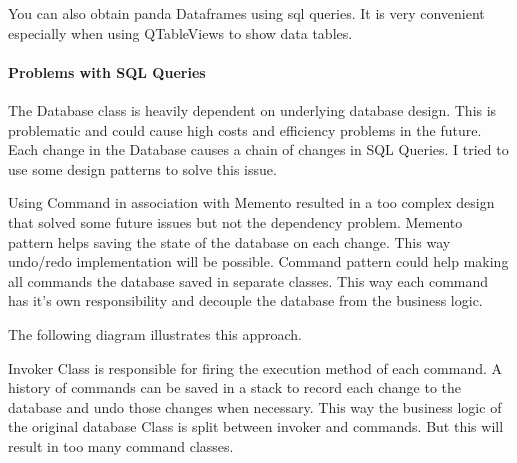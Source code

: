 \documentclass[letterpaper,10pt,english]{sphinxmanual}
\begin{document}
You can also obtain panda Dataframes using sql queries. It is very convenient especially when using QTableViews to show
data tables.

\begin{sphinxVerbatim}[commandchars=\\\{\}]
  
   
 
\end{sphinxVerbatim}


\paragraph{Problems with SQL Queries}
\label{\detokenize{implementation:problems-with-sql-queries}}
The Database class is heavily dependent on underlying database design. This is problematic and could cause high costs and efficiency problems in the future.  Each change in the Database causes a chain of changes in SQL Queries.
I tried to use some design patterns to solve this issue.

Using Command in association with Memento resulted in a too complex design that solved some future issues but not the dependency problem.
Memento pattern helps saving the state of the database on each change. This way undo/redo implementation will be possible.
Command pattern could help making all commands the database saved in separate classes. This way each command has it’s
own responsibility and decouple the database from the business logic.

The following diagram illustrates this approach.

\begin{figure}[htbp]
\centering

\noindent{}
\end{figure}

Invoker Class is responsible for firing the execution method of each command. A history of commands can be saved in a stack to record each change to the database and undo those changes when necessary.
This way the business logic of the original database Class is split between invoker and commands. But this will result in too many command classes.
\end{document}
